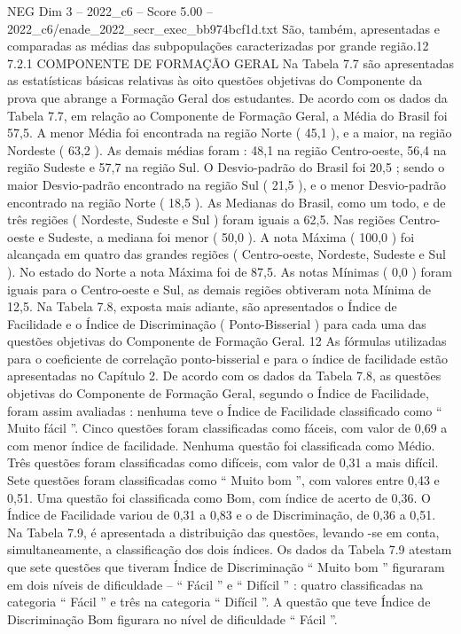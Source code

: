 \begin{textsample}{NEG Dim 3 – 2022\_c6 – Score 5.00 – 2022\_c6/enade\_2022\_secr\_exec\_bb974bcf1d.txt}
São, também, apresentadas e comparadas as médias das subpopulações caracterizadas por grande região.12 7.2.1 COMPONENTE DE FORMAÇÃO GERAL Na Tabela 7.7 são apresentadas as estatísticas básicas relativas às oito questões objetivas do Componente da prova que abrange a Formação Geral dos estudantes.
De acordo com os dados da Tabela 7.7, em relação ao Componente de Formação Geral, a Média do Brasil foi 57,5.
A menor Média foi encontrada na região Norte ( 45,1 ), e a maior, na região Nordeste ( 63,2 ).
As demais médias foram : 48,1 na região Centro-oeste, 56,4 na região Sudeste e 57,7 na região Sul.
O Desvio-padrão do Brasil foi 20,5 ; sendo o maior Desvio-padrão encontrado na região Sul ( 21,5 ), e o menor Desvio-padrão encontrado na região Norte ( 18,5 ).
As Medianas do Brasil, como um todo, e de três regiões ( Nordeste, Sudeste e Sul ) foram iguais a 62,5.
Nas regiões Centro-oeste e Sudeste, a mediana foi menor ( 50,0 ).
A nota Máxima ( 100,0 ) foi alcançada em quatro das grandes regiões ( Centro-oeste, Nordeste, Sudeste e Sul ).
No estado do Norte a nota Máxima foi de 87,5.
As notas Mínimas ( 0,0 ) foram iguais para o Centro-oeste e Sul, as demais regiões obtiveram nota Mínima de 12,5.
Na Tabela 7.8, exposta mais adiante, são apresentados o Índice de Facilidade e o Índice de Discriminação ( Ponto-Bisserial ) para cada uma das questões objetivas do Componente de Formação Geral. 12 As fórmulas utilizadas para o coeficiente de correlação ponto-bisserial e para o índice de facilidade estão apresentadas no Capítulo 2.
De acordo com os dados da Tabela 7.8, as questões objetivas do Componente de Formação Geral, segundo o Índice de Facilidade, foram assim avaliadas : nenhuma teve o Índice de Facilidade classificado como “ Muito fácil ”.
Cinco questões foram classificadas como fáceis, com valor de 0,69 a com menor índice de facilidade.
Nenhuma questão foi classificada como Médio.
Três questões foram classificadas como difíceis, com valor de 0,31 a mais difícil.
Sete questões foram classificadas como “ Muito bom ”, com valores entre 0,43 e 0,51.
Uma questão foi classificada como Bom, com índice de acerto de 0,36.
O Índice de Facilidade variou de 0,31 a 0,83 e o de Discriminação, de 0,36 a 0,51.
Na Tabela 7.9, é apresentada a distribuição das questões, levando -se em conta, simultaneamente, a classificação dos dois índices.
Os dados da Tabela 7.9 atestam que sete questões que tiveram Índice de Discriminação “ Muito bom ” figuraram em dois níveis de dificuldade – “ Fácil ” e “ Difícil ” : quatro classificadas na categoria “ Fácil ” e três na categoria “ Difícil ”.
A questão que teve Índice de Discriminação Bom figurara no nível de dificuldade “ Fácil ”.

\end{textsample}
